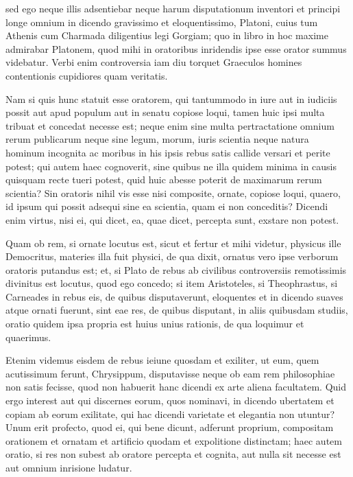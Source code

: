  sed ego neque illis adsentiebar neque harum disputationum inventori et principi longe omnium in dicendo gravissimo et eloquentissimo, Platoni, cuius tum Athenis cum Charmada diligentius legi Gorgiam; quo in libro in hoc maxime admirabar Platonem, quod mihi in oratoribus inridendis ipse esse orator summus videbatur. Verbi enim controversia iam diu torquet Graeculos homines contentionis cupidiores quam veritatis.

 Nam si quis hunc statuit esse oratorem, qui tantummodo in iure aut in iudiciis possit aut apud populum aut in senatu copiose loqui, tamen huic ipsi multa tribuat et concedat necesse est; neque enim sine multa pertractatione omnium rerum publicarum neque sine legum, morum, iuris scientia neque natura hominum incognita ac moribus in his ipsis rebus satis callide versari et perite potest; qui autem haec cognoverit, sine quibus ne illa quidem minima in causis quisquam recte tueri potest, quid huic abesse poterit de maximarum rerum scientia? Sin oratoris nihil vis esse nisi composite, ornate, copiose loqui, quaero, id ipsum qui possit adsequi sine ea scientia, quam ei non conceditis? Dicendi enim virtus, nisi ei, qui dicet, ea, quae dicet, percepta sunt, exstare non potest.

 Quam ob rem, si ornate locutus est, sicut et fertur et mihi videtur, physicus ille Democritus, materies illa fuit physici, de qua dixit, ornatus vero ipse verborum oratoris putandus est; et, si Plato de rebus ab civilibus controversiis remotissimis divinitus est locutus, quod ego concedo; si item Aristoteles, si Theophrastus, si Carneades in rebus eis, de quibus disputaverunt, eloquentes et in dicendo suaves atque ornati fuerunt, sint eae res, de quibus disputant, in aliis quibusdam studiis, oratio quidem ipsa propria est huius unius rationis, de qua loquimur et quaerimus.

 Etenim videmus eisdem de rebus ieiune quosdam et exiliter, ut eum, quem acutissimum ferunt, Chrysippum, disputavisse neque ob eam rem philosophiae non satis fecisse, quod non habuerit hanc dicendi ex arte aliena facultatem. Quid ergo interest aut qui discernes eorum, quos nominavi, in dicendo ubertatem et copiam ab eorum exilitate, qui hac dicendi varietate et elegantia non utuntur? Unum erit profecto, quod ei, qui bene dicunt, adferunt proprium, compositam orationem et ornatam et artificio quodam et expolitione distinctam; haec autem oratio, si res non subest ab oratore percepta et cognita, aut nulla sit necesse est aut omnium inrisione ludatur.

